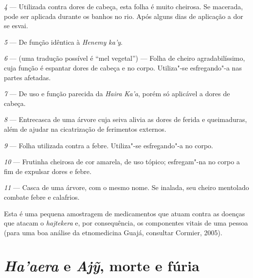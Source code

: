 \emph{4} --- Utilizada contra dores de cabeça, esta folha é
muito cheirosa. Se macerada, pode ser aplicada durante os banhos no rio.
Após alguns dias de aplicação a dor se esvai.

\emph{5} --- De função idêntica à \emph{Henemy ka'y}.

\emph{6} --- (uma tradução possível é ``mel vegetal'') --- Folha de
cheiro agradabilíssimo, cuja função é espantar dores de cabeça e no
corpo. Utiliza"-se esfregando"-a nas partes afetadas.

\emph{7} --- De uso e função parecida da \emph{Haira Ka'a},
porém só aplicável a dores de cabeça.

\emph{8} --- Entrecasca de uma árvore cuja seiva alivia as dores
de ferida e queimaduras, além de ajudar na cicatrização de ferimentos
externos.

\emph{9} --- Folha utilizada contra a febre. Utiliza"-se
esfregando"-a no corpo.

\emph{10} --- Frutinha cheirosa de cor amarela, de uso tópico;
esfregam"-na no corpo a fim de expulsar dores e febre.

\emph{11} --- Casca de uma árvore, com o mesmo nome. Se inalada,
seu cheiro mentolado combate febre e calafrios.

Esta é uma pequena amostragem de medicamentos que atuam contra as
doenças que atacam o \emph{hajtekera} e, por consequência, os
componentes vitais de uma pessoa (para uma boa análise da etnomedicina
Guajá, consultar Cormier, 2005).

\section{\emph{Ha'aera} e \emph{Ajỹ}, morte e
fúria}\label{haaera-e-ajy-morte-e-fuxfaria}


